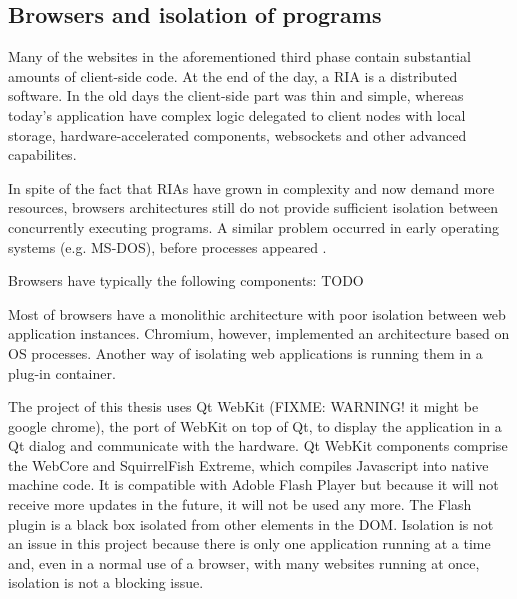 \subsection{Browsers and isolation of programs}    
Many of the websites in the aforementioned third phase contain substantial amounts of client-side code. At the end of the day, a \ac{RIA} is a distributed software. 
In the old days the client-side part was thin and simple, whereas today's application have complex logic delegated to client nodes with local storage, hardware-accelerated components, websockets and other advanced capabilites.

In spite of the fact that \acp{RIA} have grown in complexity and now demand more resources, browsers architectures still do not provide sufficient isolation between concurrently executing programs.
A similar problem occurred in early operating systems (e.g. MS-DOS), before processes appeared \cite{Reis:2009}. 

Browsers have typically the following components: TODO

Most of browsers have a monolithic architecture with poor isolation between web application instances. Chromium, however, implemented an architecture based on OS processes. 
Another way of isolating web applications is running them in a plug-in container. 

The project of this thesis uses Qt WebKit (FIXME: WARNING! it might be google chrome), the port of WebKit on top of Qt, to display the application in a Qt dialog and communicate with the hardware. 
Qt WebKit components comprise the WebCore and SquirrelFish Extreme, which compiles Javascript into native machine code. 
It is compatible with Adoble Flash Player but because it will not receive more updates in the future, it will not be used any more.
The Flash plugin is a black box isolated from other elements in the \ac{DOM}.
Isolation is not an issue in this project because there is only one application running at a time and, even in a normal use of a browser, with many websites running at once, isolation is not a blocking issue.



